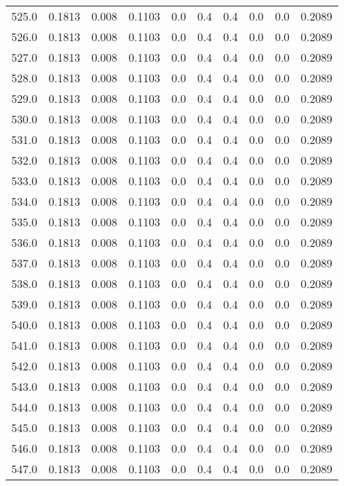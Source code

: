 \begin{longtable}{lrrrrrrrrr}
525.0 & 0.1813 & 0.008 & 0.1103 & 0.0 & 0.4 & 0.4 & 0.0 & 0.0 & 0.2089 \\
526.0 & 0.1813 & 0.008 & 0.1103 & 0.0 & 0.4 & 0.4 & 0.0 & 0.0 & 0.2089 \\
527.0 & 0.1813 & 0.008 & 0.1103 & 0.0 & 0.4 & 0.4 & 0.0 & 0.0 & 0.2089 \\
528.0 & 0.1813 & 0.008 & 0.1103 & 0.0 & 0.4 & 0.4 & 0.0 & 0.0 & 0.2089 \\
529.0 & 0.1813 & 0.008 & 0.1103 & 0.0 & 0.4 & 0.4 & 0.0 & 0.0 & 0.2089 \\
530.0 & 0.1813 & 0.008 & 0.1103 & 0.0 & 0.4 & 0.4 & 0.0 & 0.0 & 0.2089 \\
531.0 & 0.1813 & 0.008 & 0.1103 & 0.0 & 0.4 & 0.4 & 0.0 & 0.0 & 0.2089 \\
532.0 & 0.1813 & 0.008 & 0.1103 & 0.0 & 0.4 & 0.4 & 0.0 & 0.0 & 0.2089 \\
533.0 & 0.1813 & 0.008 & 0.1103 & 0.0 & 0.4 & 0.4 & 0.0 & 0.0 & 0.2089 \\
534.0 & 0.1813 & 0.008 & 0.1103 & 0.0 & 0.4 & 0.4 & 0.0 & 0.0 & 0.2089 \\
535.0 & 0.1813 & 0.008 & 0.1103 & 0.0 & 0.4 & 0.4 & 0.0 & 0.0 & 0.2089 \\
536.0 & 0.1813 & 0.008 & 0.1103 & 0.0 & 0.4 & 0.4 & 0.0 & 0.0 & 0.2089 \\
537.0 & 0.1813 & 0.008 & 0.1103 & 0.0 & 0.4 & 0.4 & 0.0 & 0.0 & 0.2089 \\
538.0 & 0.1813 & 0.008 & 0.1103 & 0.0 & 0.4 & 0.4 & 0.0 & 0.0 & 0.2089 \\
539.0 & 0.1813 & 0.008 & 0.1103 & 0.0 & 0.4 & 0.4 & 0.0 & 0.0 & 0.2089 \\
540.0 & 0.1813 & 0.008 & 0.1103 & 0.0 & 0.4 & 0.4 & 0.0 & 0.0 & 0.2089 \\
541.0 & 0.1813 & 0.008 & 0.1103 & 0.0 & 0.4 & 0.4 & 0.0 & 0.0 & 0.2089 \\
542.0 & 0.1813 & 0.008 & 0.1103 & 0.0 & 0.4 & 0.4 & 0.0 & 0.0 & 0.2089 \\
543.0 & 0.1813 & 0.008 & 0.1103 & 0.0 & 0.4 & 0.4 & 0.0 & 0.0 & 0.2089 \\
544.0 & 0.1813 & 0.008 & 0.1103 & 0.0 & 0.4 & 0.4 & 0.0 & 0.0 & 0.2089 \\
545.0 & 0.1813 & 0.008 & 0.1103 & 0.0 & 0.4 & 0.4 & 0.0 & 0.0 & 0.2089 \\
546.0 & 0.1813 & 0.008 & 0.1103 & 0.0 & 0.4 & 0.4 & 0.0 & 0.0 & 0.2089 \\
547.0 & 0.1813 & 0.008 & 0.1103 & 0.0 & 0.4 & 0.4 & 0.0 & 0.0 & 0.2089 \\

\end{longtable}
